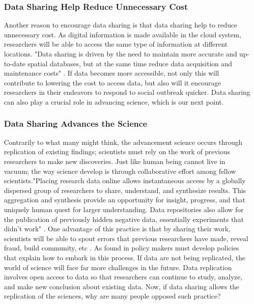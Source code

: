 \documentclass[sigconf]{acmart}
\begin{document}
\subsubsection{Data Sharing Help Reduce Unnecessary Cost
}

Another reason to encourage data sharing is that data sharing help to reduce unnecessary cost. As digital information is made available in the cloud system, researchers will be able to access the same type of information at different locations.  "Data sharing is driven by the need to maintain more accurate and up-to-date spatial databases, but at the same time reduce data acquisition and maintenance costs" \cite{stoakes2005data}. If data becomes more accessible, not only this will contribute to lowering the cost to access data, but also will it encourage researchers in their endeavors to respond to social outbreak quicker. Data sharing can also play a crucial role in advancing science, which is our next point. 

\subsubsection{Data Sharing Advances the Science}

Contrarily to what many might think, the advancement science occurs through replication of existing findings; scientists must rely on the work of previous researchers to make new discoveries. Just like human being cannot live in vacuum; the way science develop is through collaborative effort among fellow scientists."Placing research data online allows instantaneous access by a globally dispersed group of researchers to share, understand, and synthesize results. This aggregation and synthesis provide an opportunity for insight, progress, and that uniquely human quest for larger understanding. Data repositories also allow for the publication of previously hidden negative data, essentially experiments that didn't work" \cite{Uswyshyn2016}. One advantage of this practice is that by sharing their work, scientists will be able to spout errors that previous researchers have made, reveal fraud, build community, etc \cite{leetaru2016}. As found in \cite{borgman2012conundrum} policy makers must develop policies that explain how to embark in this process. If data are not being replicated, the world of science will face far more challenges in the future. Data replication involves open access to data so that researchers can continue to study, analyze, and make new conclusion about existing data. Now, if data sharing allows the replication of the sciences, why are many people opposed such practice? 
\end{document}

